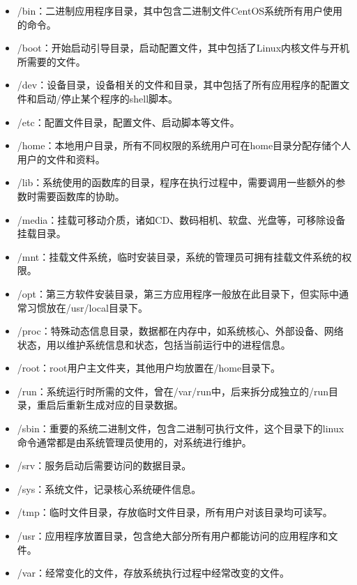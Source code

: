 \documentclass[12pt, openany, oneside]{book}
\begin{document}
\begin{itemize}
	\item /bin：二进制应用程序目录，其中包含二进制文件CentOS系统所有用户使用的命令。

	\item /boot：开始启动引导目录，启动配置文件，其中包括了Linux内核文件与开机所需要的文件。

	\item /dev：设备目录，设备相关的文件和目录，其中包括了所有应用程序的配置文件和启动/停止某个程序的shell脚本。

	\item /etc：配置文件目录，配置文件、启动脚本等文件。

	\item /home：本地用户目录，所有不同权限的系统用户可在home目录分配存储个人用户的文件和资料。

	\item /lib：系统使用的函数库的目录，程序在执行过程中，需要调用一些额外的参数时需要函数库的协助。

	\item /media：挂载可移动介质，诸如CD、数码相机、软盘、光盘等，可移除设备挂载目录。

	\item /mnt：挂载文件系统，临时安装目录，系统的管理员可拥有挂载文件系统的权限。

	\item /opt：第三方软件安装目录，第三方应用程序一般放在此目录下，但实际中通常习惯放在/usr/local目录下。

	\item /proc：特殊动态信息目录，数据都在内存中，如系统核心、外部设备、网络状态，用以维护系统信息和状态，包括当前运行中的进程信息。

	\item /root：root用户主文件夹，其他用户均放置在/home目录下。

	\item /run：系统运行时所需的文件，曾在/var/run中，后来拆分成独立的/run目录，重启后重新生成对应的目录数据。

	\item /sbin：重要的系统二进制文件，包含二进制可执行文件，这个目录下的linux命令通常都是由系统管理员使用的，对系统进行维护。

	\item /srv：服务启动后需要访问的数据目录。

	\item /sys：系统文件，记录核心系统硬件信息。

	\item /tmp：临时文件目录，存放临时文件目录，所有用户对该目录均可读写。

	\item /usr：应用程序放置目录，包含绝大部分所有用户都能访问的应用程序和文件。

	\item /var：经常变化的文件，存放系统执行过程中经常改变的文件。
\end{itemize}
\end{document}
